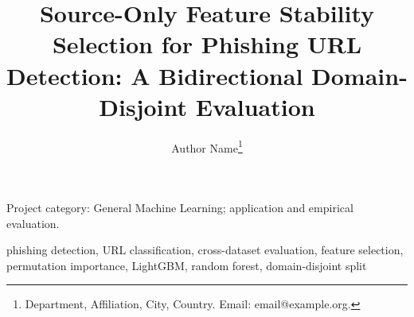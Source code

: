 \documentclass[journal]{IEEEtran}
\begin{document}
\title{Source-Only Feature Stability Selection for Phishing URL Detection: A Bidirectional Domain-Disjoint Evaluation}

\author{Author Name\thanks{Department, Affiliation, City, Country. Email: email@example.org.}}

\maketitle
\begin{center}\small Project category: General Machine Learning; application and empirical evaluation.\end{center}



\begin{IEEEkeywords}
phishing detection, URL classification, cross-dataset evaluation, feature selection, permutation importance, LightGBM, random forest, domain-disjoint split
\end{IEEEkeywords}








\clearpage


\end{document}
